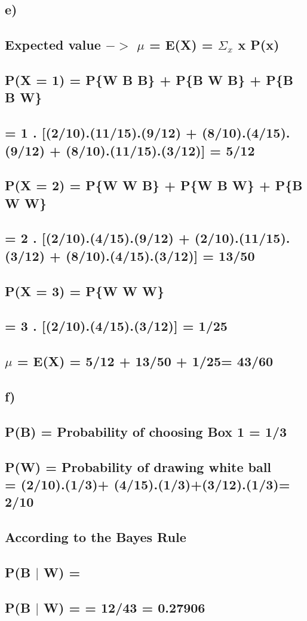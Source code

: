\documentclass[15pt]{article}
\begin{document}
\subsection*{e)
\\\\Expected value ${->}$ \hspace*{10} ${\mu}$ = E(X) = ${\Sigma_{x}}$ x P(x)
\\\\ \hspace*{50} P(X = 1) = P\{W B B\} + P\{B W B\} + P\{B B W\}
\\\\          = 1 . [(2/10).(11/15).(9/12) + (8/10).(4/15).(9/12) + (8/10).(11/15).(3/12)] = 5/12
\\\\ \hspace*{50} P(X = 2) = P\{W W B\} + P\{W B W\} + P\{B W W\}
\\\\          = 2 . [(2/10).(4/15).(9/12) + (2/10).(11/15).(3/12) + (8/10).(4/15).(3/12)] = 13/50
\\\\ \hspace*{50} P(X = 3) = P\{W W W\}
\\\\          = 3 . [(2/10).(4/15).(3/12)] = 1/25
\\\\ \hspace* {50} ${\mu}$ = E(X) = 5/12 + 13/50 + 1/25= 43/60
\\
}
\newpage
\subsection*{f)
\\\\P(B) = Probability of choosing Box 1 = 1/3       
\\\\P(W) = Probability of drawing white ball 
\\  \hspace*{35} = (2/10).(1/3)+ (4/15).(1/3)+(3/12).(1/3)= 2/10
\\\\According to the Bayes Rule 
\\\\ \hspace*{50} P(B ${\mid}$ W) = 
\\\\ \hspace*{50} P(B ${\mid}$ W) =  = 12/43 = 0.27906
\\\\
}
\end{document}

